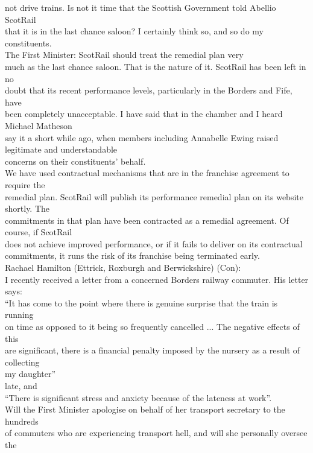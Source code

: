 \documentclass{article}
\begin{document}
\begin{description}
{not drive trains. Is not it time that the Scottish Government told Abellio ScotRail\\
that it is in the last chance saloon? I certainly think so, and so do my constituents.\\
The First Minister: ScotRail should treat the remedial plan very\\
much as the last chance saloon. That is the nature of it. ScotRail has been left in no\\
doubt that its recent performance levels, particularly in the Borders and Fife, have\\
been completely unacceptable. I have said that in the chamber and I heard Michael Matheson\\
say it a short while ago, when members including Annabelle Ewing raised legitimate and understandable\\
concerns on their constituents’ behalf.\\
We have used contractual mechanisms that are in the franchise agreement to require the\\
remedial plan. ScotRail will publish its performance remedial plan on its website shortly. The\\
commitments in that plan have been contracted as a remedial agreement. Of course, if ScotRail\\
does not achieve improved performance, or if it fails to deliver on its contractual\\
commitments, it runs the risk of its franchise being terminated early.\\
Rachael Hamilton (Ettrick, Roxburgh and Berwickshire) (Con):\\
I recently received a letter from a concerned Borders railway commuter. His letter says:\\
“It has come to the point where there is genuine surprise that the train is running\\
on time as opposed to it being so frequently cancelled ... The negative effects of this\\
are significant, there is a financial penalty imposed by the nursery as a result of collecting\\
my daughter”\\
late, and\\
“There is significant stress and anxiety because of the lateness at work”.\\
Will the First Minister apologise on behalf of her transport secretary to the hundreds\\
of commuters who are experiencing transport hell, and will she personally oversee the\\
}
\end{description}
\end{document}
